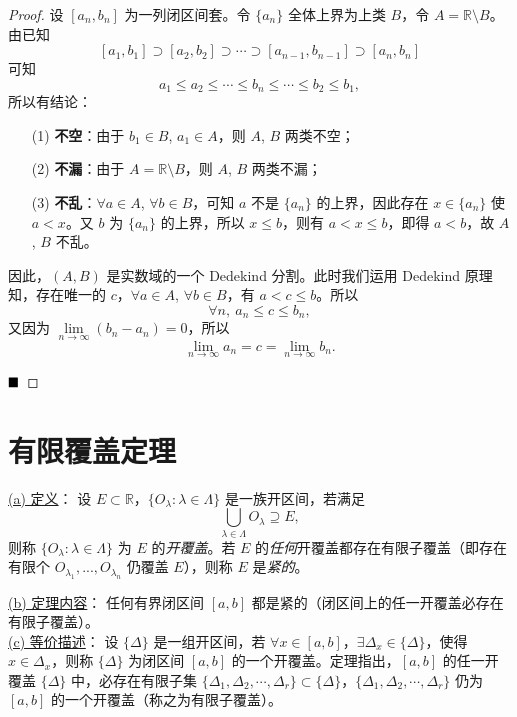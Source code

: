 \begin{proof}
    设 $[a_n, b_n]$ 为一列闭区间套。令 $\{a_n\}$ 全体上界为上类 $B$，令 $A = \mathbb{R} \setminus B$。由已知
    \[
    [a_1, b_1] \supset [a_2, b_2] \supset \cdots \supset [a_{n-1}, b_{n-1}] \supset [a_n, b_n]
    \]
    可知
    \[
    a_1 \leq a_2 \leq \cdots \leq b_n \leq \cdots \leq b_2 \leq b_1,
    \]
    所以有结论：
    
    \begin{enumerate}
        \item[(1)] \textbf{不空}：由于 $b_1 \in B$, $a_1 \in A$，则 $A$, $B$ 两类不空；
        
        \item[(2)] \textbf{不漏}：由于 $A = \mathbb{R} \setminus B$，则 $A$, $B$ 两类不漏；
        
        \item[(3)] \textbf{不乱}：$\forall a \in A$, $\forall b \in B$，可知 $a$ 不是 $\{a_n\}$ 的上界，因此存在 $x \in \{a_n\}$ 使 $a < x$。又 $b$ 为 $\{a_n\}$ 的上界，所以 $x \leq b$，则有 $a < x \leq b$，即得 $a < b$，故 $A$, $B$ 不乱。
    \end{enumerate}
    
    因此，$(A, B)$ 是实数域的一个 Dedekind 分割。此时我们运用 Dedekind 原理知，存在唯一的 $c$，$\forall a \in A$, $\forall b \in B$，有 $a < c \leq b$。所以
    \[
    \forall n,\ a_n \leq c \leq b_n,
    \]
    又因为 $\lim\limits_{n \to \infty} (b_n - a_n) = 0$，所以
    \[
    \lim\limits_{n \to \infty} a_n = c = \lim\limits_{n \to \infty} b_n.
    \]
    
    $\hfill \blacksquare$
\end{proof}

\newpage
\section{有限覆盖定理}
\begin{theorem}[有限覆盖定理]
    \underline{(a) 定义}：
    设 \( E \subset \mathbb{R} \)，\(\{O_\lambda : \lambda \in \Lambda\}\) 是一族开区间，若满足
    \[
    \bigcup_{\lambda \in \Lambda} O_\lambda \supseteq E,
    \]
    则称 \(\{O_\lambda : \lambda \in \Lambda\}\) 为 \( E \) 的\emph{开覆盖}。若 \( E \) 的\emph{任何}开覆盖都存在有限子覆盖（即存在有限个 \(O_{\lambda_1},...,O_{\lambda_n}\) 仍覆盖 \(E\)），则称 \( E \) 是\emph{紧的}。
    
    \underline{(b) 定理内容}：
    任何有界闭区间 \([a, b]\) 都是紧的（闭区间上的任一开覆盖必存在有限子覆盖）。\\
    \underline{(c) 等价描述}：
    设 \(\{ \Delta \}\) 是一组开区间，若 \(\forall x \in [a,b]\)，\(\exists \Delta_x \in \{ \Delta \}\)，使得 \(x \in \Delta_x\)，则称 \(\{ \Delta \}\) 为闭区间 \([a,b]\) 的一个开覆盖。定理指出，\([a,b]\) 的任一开覆盖 \(\{ \Delta \}\) 中，必存在有限子集 \(\{\Delta_1, \Delta_2, \cdots, \Delta_r\} \subset \{ \Delta \}\)，\(\{\Delta_1, \Delta_2, \cdots, \Delta_r\}\) 仍为 \([a,b]\) 的一个开覆盖（称之为有限子覆盖）。
\end{theorem}


